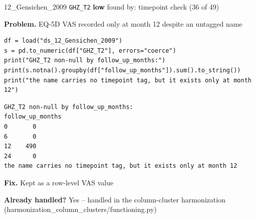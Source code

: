 \documentclass[9pt, t, handout]{beamer}
\newcommand{\ans}[1]{\textcolor{structure.fg}{#1}}
\begin{document}
\begin{frame}[fragile]{12\_Gensichen\_2009 \quad \texttt{GHZ\_T2}}
  {\scriptsize\textcolor{black!55}{\textbf{low}} \quad
   found by: timepoint check \quad (36 of 49)}
  \vspace{3pt}

  {\footnotesize \textbf{Problem.} EQ-5D VAS recorded only at month 12 despite an untagged name}
  \vspace{4pt}

  \begin{Verbatim}[fontsize=\tiny, frame=single, framesep=2pt, label=\tiny reproduce]
df = load("ds_12_Gensichen_2009")
s = pd.to_numeric(df["GHZ_T2"], errors="coerce")
print("GHZ_T2 non-null by follow_up_months:")
print(s.notna().groupby(df["follow_up_months"]).sum().to_string())
print("the name carries no timepoint tag, but it exists only at month 12")
  \end{Verbatim}
  \begin{Verbatim}[fontsize=\tiny, frame=single, framesep=2pt, label=\tiny output]
GHZ_T2 non-null by follow_up_months:
follow_up_months
0       0
6       0
12    490
24      0
the name carries no timepoint tag, but it exists only at month 12
  \end{Verbatim}
  \vspace{2pt}

  {\footnotesize \textbf{Fix.} Kept as a row-level VAS value}
  \vspace{2pt}

  {\footnotesize \textbf{Already handled?} \ans{Yes} -- handled in the column-cluster harmonization
   (harmonization\_column\_clusters/functioning.py)}
\end{frame}
\end{document}
